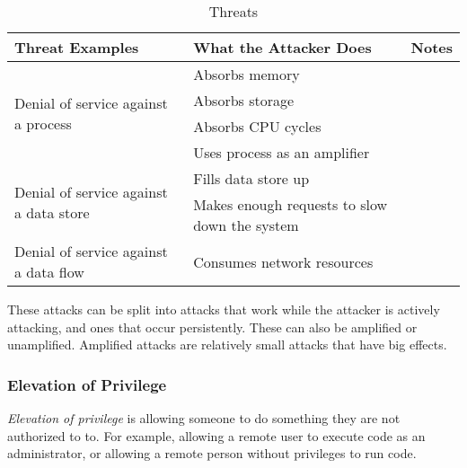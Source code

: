 \begin{table}[h!]
  \centering
  \begin{tabular}{p{5.7cm}p{5.7cm}p{5.7cm}}
    \toprule
    Threat Examples & What the Attacker Does & Notes \\
    \midrule
    \multirow{4}{5.7cm}{Denial of service against a process} & Absorbs memory & \\ \cline{2-3}
                    & Absorbs storage & \\ \cline{2-3}
                    & Absorbs CPU cycles & \\ \cline{2-3}
                    & Uses process as an amplifier & \\
    \midrule
    \multirow{2}{5.7cm}{Denial of service against a data store} & Fills data store up & \\ \cline{2-3}
                    & Makes enough requests to slow down the system & \\
    \midrule
    \multirow{1}{5.7cm}{Denial of service against a data flow} & Consumes network resources & \\
    \bottomrule
  \end{tabular}
  \caption{ Threats}
  \label{tab:Denial_of_Service_Threats}
\end{table}

These attacks can be split into attacks that work while the attacker is actively attacking, and ones that occur persistently.
These can also be amplified or unamplified.
Amplified attacks are relatively small attacks that have big effects.

\subsubsection{Elevation of Privilege}\label{subsubsec:Elevation_of_Privilege}
\begin{definition}\label{def:Elevation_of_Privilege}
  \emph{Elevation of privilege} is allowing someone to do something they are not authorized to to.
  For example, allowing a remote user to execute code as an administrator, or allowing a remote person without privileges to run code.
\end{definition}

